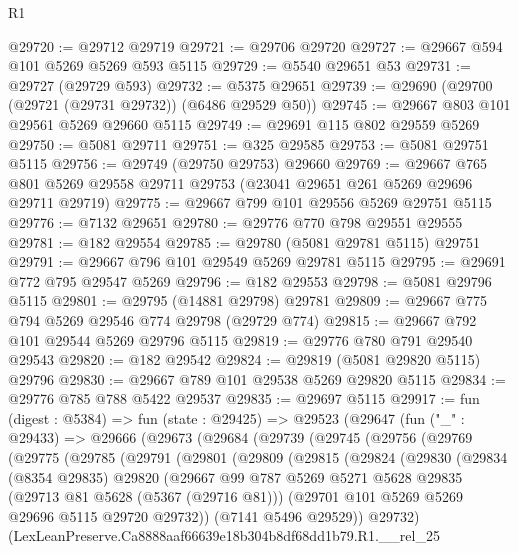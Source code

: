 \begin{lexlean}{R1}
\begin{coremodule}
@29720 := @29712 @29719
@29721 := @29706 @29720
@29727 := @29667 @594 @101 @5269 @5269 @593 @5115
@29729 := @5540 @29651 @53
@29731 := @29727 (@29729 @593)
@29732 := @5375 @29651
@29739 := @29690 (@29700 (@29721 (@29731 @29732)) (@6486 @29529 @50))
@29745 := @29667 @803 @101 @29561 @5269 @29660 @5115
@29749 := @29691 @115 @802 @29559 @5269
@29750 := @5081 @29711
@29751 := @325 @29585
@29753 := @5081 @29751 @5115
@29756 := @29749 (@29750 @29753) @29660
@29769 := @29667
    @765
    @801
    @5269
    @29558
    @29711
    @29753
    (@23041 @29651 @261 @5269 @29696 @29711 @29719)
@29775 := @29667 @799 @101 @29556 @5269 @29751 @5115
@29776 := @7132 @29651
@29780 := @29776 @770 @798 @29551 @29555
@29781 := @182 @29554
@29785 := @29780 (@5081 @29781 @5115) @29751
@29791 := @29667 @796 @101 @29549 @5269 @29781 @5115
@29795 := @29691 @772 @795 @29547 @5269
@29796 := @182 @29553
@29798 := @5081 @29796 @5115
@29801 := @29795 (@14881 @29798) @29781
@29809 := @29667 @775 @794 @5269 @29546 @774 @29798 (@29729 @774)
@29815 := @29667 @792 @101 @29544 @5269 @29796 @5115
@29819 := @29776 @780 @791 @29540 @29543
@29820 := @182 @29542
@29824 := @29819 (@5081 @29820 @5115) @29796
@29830 := @29667 @789 @101 @29538 @5269 @29820 @5115
@29834 := @29776 @785 @788 @5422 @29537
@29835 := @29697 @5115
@29917 := fun (digest : @5384) =>
  fun (state : @29425) =>
  @29523
    (@29647
      (fun ("_" : @29433) =>
      @29666
        (@29673
          (@29684
            (@29739
              (@29745
                (@29756
                  (@29769
                    (@29775
                      (@29785
                        (@29791
                          (@29801
                            (@29809
                              (@29815
                                (@29824
                                  (@29830
                                    (@29834
                                      (@8354 @29835)
                                      @29820
                                      (@29667
                                        @99
                                        @787
                                        @5269
                                        @5271
                                        @5628
                                        @29835
                                        (@29713 @81 @5628 (@5367 (@29716 @81)))
                                        (@29701 @101 @5269 @5269 @29696 @5115 @29720 @29732))
                                      (@7141 @5496 @29529))
                                    @29732)
                                  (LexLeanPreserve.Ca8888aaf66639e18b304b8df68dd1b79.R1.__rel_25

\end{coremodule}
\end{lexlean}
